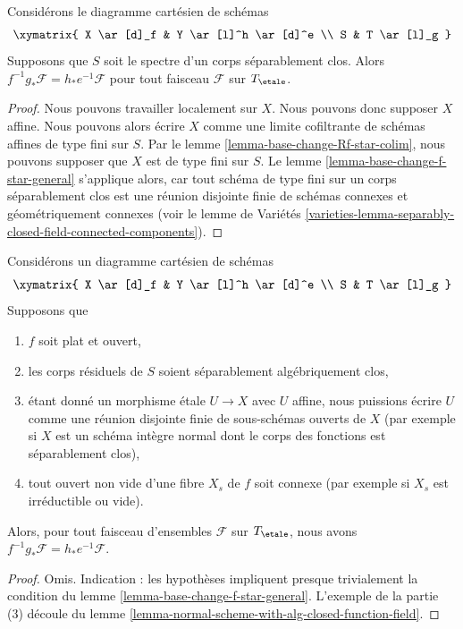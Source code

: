 \begin{lemma}
\label{lemma-base-change-f-star-field}
Considérons le diagramme cartésien de schémas
$$
\xymatrix{
X \ar[d]_f & Y \ar[l]^h \ar[d]^e \\
S & T \ar[l]_g
}
$$
Supposons que $S$ soit le spectre d'un corps séparablement clos.
Alors $f^{-1}g_*\mathcal{F} = h_*e^{-1}\mathcal{F}$
pour tout faisceau $\mathcal{F}$ sur $T_\etale$.
\end{lemma}

\begin{proof}
Nous pouvons travailler localement sur $X$. Nous pouvons donc supposer $X$ affine.
Nous pouvons alors écrire $X$ comme une limite cofiltrante de schémas affines
de type fini sur $S$. Par le lemme \ref{lemma-base-change-Rf-star-colim},
nous pouvons supposer que $X$ est de type fini sur $S$.
Le lemme \ref{lemma-base-change-f-star-general}
s'applique alors, car tout schéma de type
fini sur un corps séparablement clos est une réunion disjointe finie
de schémas connexes et géométriquement connexes
(voir le lemme de Variétés
\ref{varieties-lemma-separably-closed-field-connected-components}).
\end{proof}

\begin{lemma}
\label{lemma-base-change-f-star-valuation}
Considérons un diagramme cartésien de schémas
$$
\xymatrix{
X \ar[d]_f & Y \ar[l]^h \ar[d]^e \\
S & T \ar[l]_g
}
$$
Supposons que
\begin{enumerate}
\item $f$ soit plat et ouvert,
\item les corps résiduels de $S$ soient séparablement algébriquement clos,
\item étant donné un morphisme étale $U \to X$ avec $U$ affine,
nous puissions écrire $U$ comme une réunion disjointe finie de sous-schémas ouverts
de $X$ (par exemple si $X$ est un schéma intègre normal
dont le corps des fonctions est séparablement clos),
\item tout ouvert non vide d'une fibre $X_s$ de $f$ soit connexe
(par exemple si $X_s$ est irréductible ou vide).
\end{enumerate}
Alors, pour tout faisceau d'ensembles $\mathcal{F}$ sur $T_\etale$, nous avons
$f^{-1}g_*\mathcal{F} = h_*e^{-1}\mathcal{F}$.
\end{lemma}

\begin{proof}
Omis. Indication : les hypothèses impliquent presque trivialement
la condition du lemme \ref{lemma-base-change-f-star-general}.
L'exemple de la partie (3) découle du
lemme \ref{lemma-normal-scheme-with-alg-closed-function-field}.
\end{proof}

